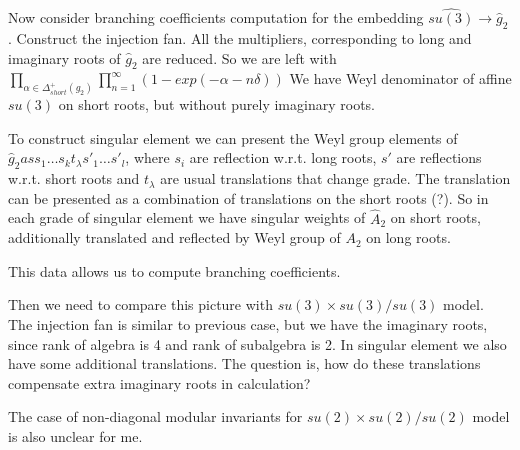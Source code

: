 \documentclass[12pt]{article}
\begin{document}
Now consider branching coefficients computation for the embedding
$\hat{su(3)}\to \hat g_2$. Construct the injection
fan. All the multipliers, corresponding to long and imaginary roots of
$\hat g_2$ are reduced. So we are left with
$\prod_{\alpha\in \Delta^+_{short} (g_2)}\prod_{n=1}^{\infty}
(1-exp(-\alpha - n\delta))$
We have Weyl denominator of affine $su(3)$ on short roots, but without
purely imaginary roots.

To construct singular element we can present the Weyl group elements
of $\hat g_2 as s_1\dots s_k t_{\lambda} s'_1\dots s'_l$,
where $s_i$ are reflection w.r.t. long roots, $s'$ are reflections w.r.t.
short roots and $t_{\lambda}$ are usual translations
that change grade. The translation can be presented as a combination
of translations on the short roots (?).
So in each grade of singular element we have singular weights of $\hat
A_2$ on short roots, additionally
translated and reflected by Weyl group of $A_2$ on long roots.

This data allows us to compute branching coefficients.

Then we need to compare this picture with $su(3)\times su(3)/su(3)$
model. The injection fan is similar to previous
case, but we have the imaginary roots, since rank of algebra is 4 and
rank of subalgebra is 2.
In singular element we also have some additional translations. The
question is, how do these translations compensate
extra imaginary roots in calculation?

The case of non-diagonal modular invariants for $su(2)\times
su(2)/su(2)$ model is also unclear for me.

{}

\end{document}
